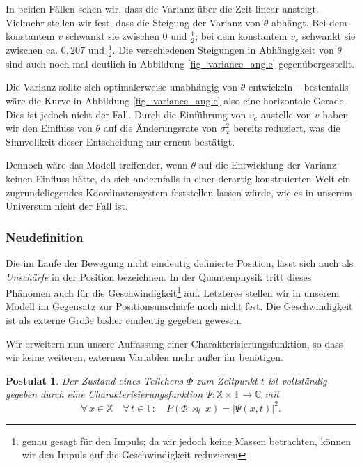 \documentclass[a4paper,12pt,ngerman]{scrartcl}
\theoremstyle{plain}
\theoremstyle{plain}
\theoremstyle{plain}
\newtheorem{postulate}{Postulat}
\theoremstyle{plain}
\newcommand{\C}{\mathbb{C}}
\newcommand{\T}{\mathbb{T}}
\newcommand{\X}{\mathbb{X}}
\newcommand{\at}[1]{\;\rtimes_{#1}\;}
\begin{document}
In beiden Fällen sehen wir, dass die Varianz über die Zeit linear ansteigt. Vielmehr stellen wir fest, dass die Steigung der Varianz von $\theta$ abhängt. Bei dem konstantem $v$ schwankt sie zwischen 0 und $\frac{1}{2}$; bei dem konstantem $v_e$ schwankt sie zwischen ca. $0,207$ und $\frac{1}{2}$. Die verschiedenen Steigungen in Abhängigkeit von $\theta$ sind auch noch mal deutlich in Abbildung \ref{fig_variance_angle} gegenübergestellt.

Die Varianz sollte sich optimalerweise unabhängig von $\theta$ entwickeln -- bestenfalls wäre die Kurve in Abbildung \ref{fig_variance_angle} also eine horizontale Gerade. Dies ist jedoch nicht der Fall. Durch die Einführung von $v_e$ anstelle von $v$ haben wir den Einfluss von $\theta$ auf die Änderungsrate von $\sigma_x^2$ bereits reduziert, was die Sinnvollkeit dieser Entscheidung nur erneut bestätigt. 

Dennoch wäre das Modell treffender, wenn $\theta$ auf die Entwicklung der Varianz keinen Einfluss hätte, da sich andernfalls in einer derartig konstruierten Welt ein zugrundeliegendes Koordinatensystem feststellen lassen würde, wie es in unserem Universum nicht der Fall ist.

\subsubsection{Neudefinition}

Die im Laufe der Bewegung nicht eindeutig definierte Position, lässt sich auch als \textit{Unschärfe} in der Position bezeichnen. In der Quantenphysik tritt dieses Phänomen auch für die Geschwindigkeit\footnote{genau gesagt für den Impuls; da wir jedoch keine Massen betrachten, können wir den Impuls auf die Geschwindigkeit reduzieren} auf. Letzteres stellen wir in unserem Modell im Gegensatz zur Positionsunschärfe noch nicht fest. Die Geschwindigkeit ist als externe Größe bisher eindeutig gegeben gewesen.

Wir erweitern nun unsere Auffassung einer Charakterisierungsfunktion, so dass wir keine weiteren, externen Variablen mehr außer ihr benötigen.

{
\begin{postulate}
Der Zustand eines Teilchens $\Phi$ zum Zeitpunkt $t$ ist vollständig gegeben durch eine Charakterisierungsfunktion $\Psi: \X\times\T\rightarrow\C$ mit
\[\forall\, x\in\X\quad\forall\, t\in\T:\quad
P(\Phi\at{t}x)=|\Psi(x,t)|^2.\]
\end{postulate}
}
\end{document}
